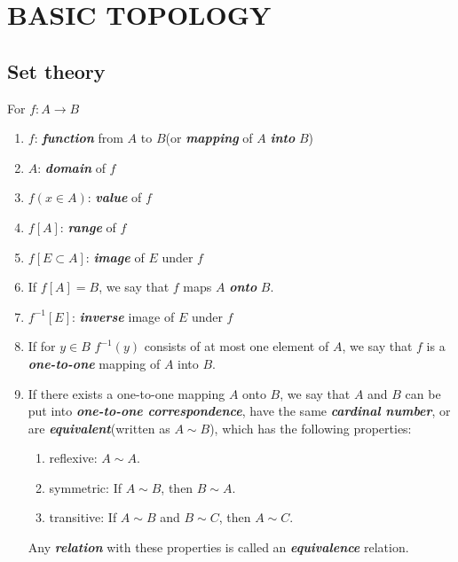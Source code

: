 
\section{BASIC TOPOLOGY}

\subsection{Set theory}

\begin{definition}[pma 2.1, 2.2, 2.3]
For $f:A\to B$
\begin{enumerate}[label={(\arabic*)}]
\item $f$: \textbf{\emph{function}} from $A$ to $B$(or \textbf{\emph{mapping}} of $A$ \textbf{\emph{into}} $B$)
\item $A$: \textbf{\emph{domain}} of $f$
\item $f(x\in A)$: \textbf{\emph{value}} of $f$
\item $f[A]$: \textbf{\emph{range}} of $f$
\item $f[E\subset A]$: \textbf{\emph{image}} of $E$ under $f$
\item If $f[A]=B$, we say that $f$ maps $A$ \textbf{\emph{onto}} $B$.
\item $f^{-1}[E]$: \textbf{\emph{inverse}} image of $E$ under $f$
\item If for $y\in B$ $f^{-1}(y)$ consists of at most one element of $A$, we say that $f$ is a \textbf{\emph{one-to-one}} mapping of $A$ into $B$.
\item If there exists a one-to-one mapping $A$ onto $B$, we say that $A$ and $B$ can be put into \textbf{\emph{one-to-one correspondence}}, have the same \textbf{\emph{cardinal number}}, or are \textbf{\emph{equivalent}}(written as $A\sim B$), which has the following properties: 
    \begin{enumerate}[label={(\alph*)}]
    \item reflexive: $A\sim A$.
    \item symmetric: If $A\sim B$, then $B\sim A$.
    \item transitive: If $A\sim B$ and $B\sim C$, then $A\sim C$.
    \end{enumerate}
Any \textbf{\emph{relation}} with these properties is called an \textbf{\emph{equivalence}} relation.
\end{enumerate}
\end{definition}

